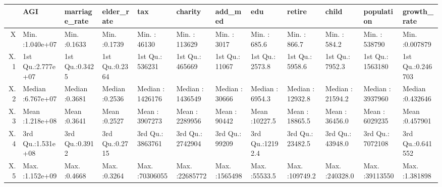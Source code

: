 \begin{table}[ht]
\centering
\begin{tabular}{rlllllllllll}
  \hline
 &      AGI & marriage\_rate &   elder\_rate &      tax &    charity &    add\_med &      edu &     retire &     child &   population &  growth\_rate \\ 
  \hline
X & Min.   :1.040e+07   & Min.   :0.1633   & Min.   :0.1739   & Min.   :   46130   & Min.   :  113629   & Min.   :   3017   & Min.   :  685.6   & Min.   :   866.7   & Min.   :   584.2   & Min.   :  538790   & Min.   :0.007879   \\ 
  X.1 & 1st Qu.:2.777e+07   & 1st Qu.:0.3425   & 1st Qu.:0.2364   & 1st Qu.:  536231   & 1st Qu.:  465669   & 1st Qu.:  11067   & 1st Qu.: 2573.8   & 1st Qu.:  5958.6   & 1st Qu.:  7952.3   & 1st Qu.: 1563180   & 1st Qu.:0.246703   \\ 
  X.2 & Median :6.767e+07   & Median :0.3681   & Median :0.2536   & Median : 1426176   & Median : 1436549   & Median :  30666   & Median : 6954.3   & Median : 12932.8   & Median : 21594.2   & Median : 3937960   & Median :0.432646   \\ 
  X.3 & Mean   :1.218e+08   & Mean   :0.3641   & Mean   :0.2527   & Mean   : 3907273   & Mean   : 2289956   & Mean   :  90442   & Mean   :10227.5   & Mean   : 18865.5   & Mean   : 36456.0   & Mean   : 6029235   & Mean   :0.457901   \\ 
  X.4 & 3rd Qu.:1.531e+08   & 3rd Qu.:0.3912   & 3rd Qu.:0.2715   & 3rd Qu.: 3863761   & 3rd Qu.: 2742904   & 3rd Qu.:  99209   & 3rd Qu.:12192.4   & 3rd Qu.: 23482.5   & 3rd Qu.: 43948.0   & 3rd Qu.: 7072108   & 3rd Qu.:0.641552   \\ 
  X.5 & Max.   :1.152e+09   & Max.   :0.4668   & Max.   :0.3264   & Max.   :70306055   & Max.   :22685772   & Max.   :1565498   & Max.   :55533.5   & Max.   :109749.2   & Max.   :240328.0   & Max.   :39113550   & Max.   :1.381898   \\ 
   \hline
\end{tabular}
\end{table}
